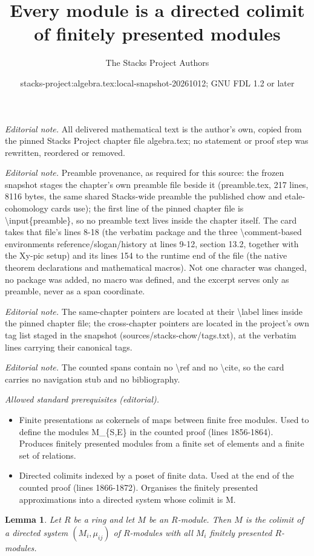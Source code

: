\documentclass[10pt,a4paper]{amsart}
\title{Every module is a directed colimit of finitely presented modules}
\author{The Stacks Project Authors}
\date{stacks-project:algebra.tex:local-snapshot-20261012; GNU FDL 1.2 or later}
\theoremstyle{plain}
\newtheorem{lemma}[subsection]{Lemma}
\theoremstyle{definition}
\theoremstyle{remark}
\numberwithin{equation}{subsection}
\begin{document}
\maketitle
\noindent\textit{Editorial note.} All delivered mathematical text is the author's own, copied from the pinned Stacks Project chapter file algebra.tex; no statement or proof step was rewritten, reordered or removed.\par\medskip
\noindent\textit{Editorial note.} Preamble provenance, as required for this source: the frozen snapshot stages the chapter's own preamble file beside it (preamble.tex, 217 lines, 8116 bytes, the same shared Stacks-wide preamble the published chow and etale-cohomology cards use); the first line of the pinned chapter file is \textbackslash{}input\{preamble\}, so no preamble text lives inside the chapter itself. The card takes that file's lines 8-18 (the verbatim package and the three \textbackslash{}comment-based environments reference/slogan/history at lines 9-12, section 13.2, together with the Xy-pic setup) and its lines 154 to the runtime end of the file (the native theorem declarations and mathematical macros). Not one character was changed, no package was added, no macro was defined, and the excerpt serves only as preamble, never as a span coordinate.\par\medskip
\noindent\textit{Editorial note.} The same-chapter pointers are located at their \textbackslash{}label lines inside the pinned chapter file; the cross-chapter pointers are located in the project's own tag list staged in the snapshot (sources/stacks-chow/tags.txt), at the verbatim lines carrying their canonical tags.\par\medskip
\noindent\textit{Editorial note.} The counted spans contain no \textbackslash{}ref and no \textbackslash{}cite, so the card carries no navigation stub and no bibliography.\par\medskip
\noindent\textit{Allowed standard prerequisites (editorial).}\begin{itemize}
\item Finite presentations as cokernels of maps between finite free modules. Used to define the modules M\_\{S,E\} in the counted proof (lines 1856-1864). Produces finitely presented modules from a finite set of elements and a finite set of relations.
\item Directed colimits indexed by a poset of finite data. Used at the end of the counted proof (lines 1866-1872). Organises the finitely presented approximations into a directed system whose colimit is M.
\end{itemize}\medskip
\begin{lemma}
\label{lemma-module-colimit-fp}
Let $R$ be a ring and let $M$ be an $R$-module.
Then $M$ is the colimit of a directed system
$(M_i, \mu_{ij})$ of $R$-modules
with all $M_i$ finitely presented $R$-modules.
\end{lemma}
\end{document}
